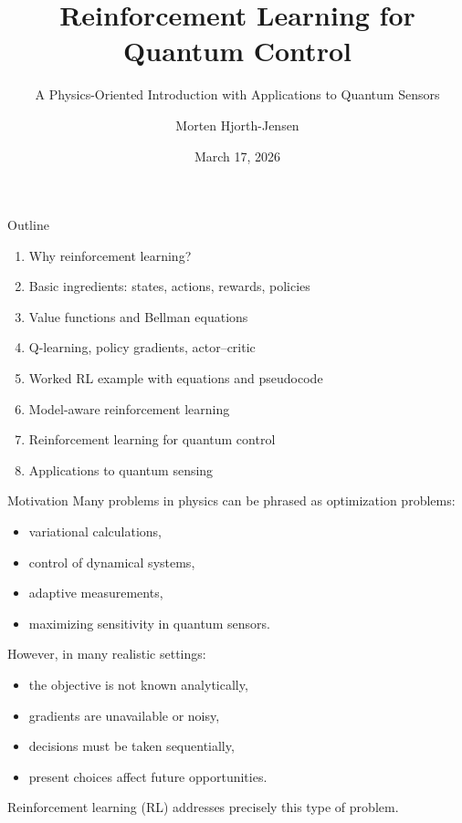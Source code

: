\documentclass{beamer}
\title{Reinforcement Learning for Quantum Control}
\subtitle{A Physics-Oriented Introduction with Applications to Quantum Sensors}
\author{Morten Hjorth-Jensen}
\date{March 17, 2026}
\begin{document}
\frame{\titlepage}

\begin{frame}{Outline}
\begin{enumerate}
\item Why reinforcement learning?
\item Basic ingredients: states, actions, rewards, policies
\item Value functions and Bellman equations
\item Q-learning, policy gradients, actor--critic
\item Worked RL example with equations and pseudocode
\item Model-aware reinforcement learning
\item Reinforcement learning for quantum control
\item Applications to quantum sensing
\end{enumerate}
\end{frame}

\begin{frame}{Motivation}
Many problems in physics can be phrased as optimization problems:
\begin{itemize}
\item variational calculations,
\item control of dynamical systems,
\item adaptive measurements,
\item maximizing sensitivity in quantum sensors.
\end{itemize}

However, in many realistic settings:
\begin{itemize}
\item the objective is not known analytically,
\item gradients are unavailable or noisy,
\item decisions must be taken sequentially,
\item present choices affect future opportunities.
\end{itemize}

Reinforcement learning (RL) addresses precisely this type of problem.
\end{frame}
\end{document}
